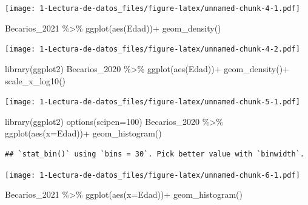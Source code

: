 \documentclass[
]{article}
\newenvironment{Shaded}{\begin{snugshade}}{\end{snugshade}}
\newcommand{\AttributeTok}[1]{\textcolor[rgb]{0.77,0.63,0.00}{#1}}
\newcommand{\DecValTok}[1]{\textcolor[rgb]{0.00,0.00,0.81}{#1}}
\newcommand{\FunctionTok}[1]{\textcolor[rgb]{0.00,0.00,0.00}{#1}}
\newcommand{\NormalTok}[1]{#1}
\newcommand{\SpecialCharTok}[1]{\textcolor[rgb]{0.00,0.00,0.00}{#1}}
\begin{document}
\texttt{[image: 1-Lectura-de-datos\_files/figure-latex/unnamed-chunk-4-1.pdf]}

\begin{Shaded}
\begin{Highlighting}[]
\NormalTok{Becarios\_2021 }\SpecialCharTok{\%\textgreater{}\%} 
  \FunctionTok{ggplot}\NormalTok{(}\FunctionTok{aes}\NormalTok{(Edad))}\SpecialCharTok{+}
  \FunctionTok{geom\_density}\NormalTok{()}
\end{Highlighting}
\end{Shaded}

\texttt{[image: 1-Lectura-de-datos\_files/figure-latex/unnamed-chunk-4-2.pdf]}

\begin{Shaded}
\begin{Highlighting}[]
\FunctionTok{library}\NormalTok{(ggplot2)}
\NormalTok{Becarios\_2020 }\SpecialCharTok{\%\textgreater{}\%} 
  \FunctionTok{ggplot}\NormalTok{(}\FunctionTok{aes}\NormalTok{(Edad))}\SpecialCharTok{+}
  \FunctionTok{geom\_density}\NormalTok{()}\SpecialCharTok{+}
  \FunctionTok{scale\_x\_log10}\NormalTok{()}
\end{Highlighting}
\end{Shaded}

\texttt{[image: 1-Lectura-de-datos\_files/figure-latex/unnamed-chunk-5-1.pdf]}

\begin{Shaded}
\begin{Highlighting}[]
\FunctionTok{library}\NormalTok{(ggplot2)}
\FunctionTok{options}\NormalTok{(}\AttributeTok{scipen=}\DecValTok{100}\NormalTok{)}
\NormalTok{Becarios\_2020 }\SpecialCharTok{\%\textgreater{}\%} 
  \FunctionTok{ggplot}\NormalTok{(}\FunctionTok{aes}\NormalTok{(}\AttributeTok{x=}\NormalTok{Edad))}\SpecialCharTok{+}
  \FunctionTok{geom\_histogram}\NormalTok{()}
\end{Highlighting}
\end{Shaded}

\begin{verbatim}
## `stat_bin()` using `bins = 30`. Pick better value with `binwidth`.
\end{verbatim}

\texttt{[image: 1-Lectura-de-datos\_files/figure-latex/unnamed-chunk-6-1.pdf]}

\begin{Shaded}
\begin{Highlighting}[]
\NormalTok{Becarios\_2021 }\SpecialCharTok{\%\textgreater{}\%} 
  \FunctionTok{ggplot}\NormalTok{(}\FunctionTok{aes}\NormalTok{(}\AttributeTok{x=}\NormalTok{Edad))}\SpecialCharTok{+}
  \FunctionTok{geom\_histogram}\NormalTok{()}
\end{Highlighting}
\end{Shaded}
\end{document}
